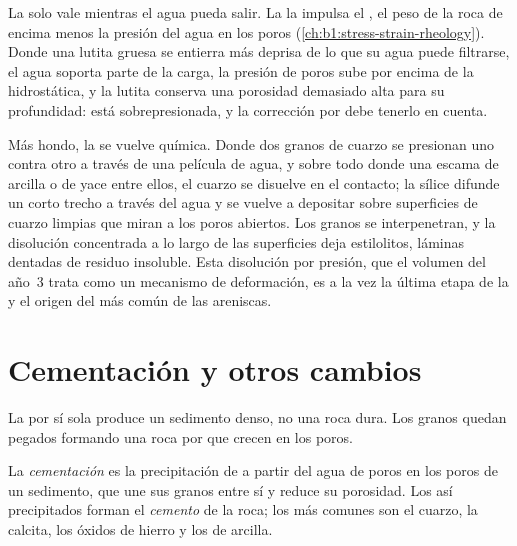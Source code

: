 La  solo vale mientras el agua pueda salir. La  la impulsa el , el peso de la roca de encima menos la presión del agua en los poros
(\cref{ch:b1:stress-strain-rheology}). Donde una lutita gruesa se entierra más deprisa de lo que su agua puede filtrarse, el agua soporta parte de la carga, la presión de poros sube por
encima de la hidrostática, y la lutita conserva una porosidad demasiado alta para su profundidad: está sobrepresionada, y la corrección por  debe tenerlo en cuenta.

Más hondo, la  se vuelve química. Donde dos granos de cuarzo se presionan uno contra otro a través de una película de agua, y sobre todo donde una escama de arcilla o de  yace
entre ellos, el cuarzo se disuelve en el contacto; la sílice difunde un corto trecho a través del agua y se vuelve a depositar sobre superficies de cuarzo limpias que miran a los poros abiertos.
Los granos se interpenetran, y la disolución concentrada a lo largo de las superficies deja estilolitos, láminas dentadas de residuo insoluble. Esta disolución por presión, que el volumen del año~3
trata como un mecanismo de deformación, es a la vez la última etapa de la  y el origen del  más común de las areniscas.

\section{Cementación y otros cambios}\label{sec:b1:diagenesis-basins:cementation}

La  por sí sola produce un sedimento denso, no una roca dura. Los granos quedan pegados formando una roca por  que crecen en los poros.

\begin{definition}\label{def:b1:diagenesis-basins:cement}
La \emph{cementación} es la precipitación de  a partir del agua de poros en los poros de un sedimento, que une sus granos entre sí y reduce su porosidad. Los  así
precipitados forman el \emph{cemento} de la roca; los más comunes son el cuarzo, la calcita, los óxidos de hierro y los  de arcilla.
\end{definition}

